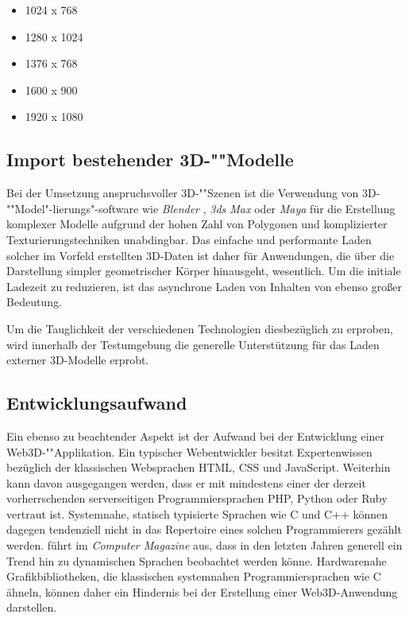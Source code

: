 \begin{itemize}[noitemsep]
	\item 1024 x 768
    \item 1280 x 1024
	\item 1376 x 768
	\item 1600 x 900
	\item 1920 x 1080
\end{itemize}

\subsection{Import bestehender 3D-""Modelle}

Bei der Umsetzung anspruchsvoller 3D-""Szenen ist die Verwendung von 3D-""Model"-lierungs"-software wie \emph{Blender} \autocite{SOFTWARE_BLENDER}, \emph{3ds Max} \autocite{SOFTWARE_3DS_MAX} oder \emph{Maya} \autocite{SOFTWARE_MAYA} für die Erstellung komplexer Modelle aufgrund der hohen Zahl von Polygonen und komplizierter Texturierungstechniken unabdingbar.
Das einfache und performante Laden solcher im Vorfeld erstellten 3D-Daten ist daher für Anwendungen, die über die Darstellung simpler geometrischer Körper hinausgeht, wesentlich. Um die initiale Ladezeit zu reduzieren, ist das asynchrone Laden von Inhalten von ebenso großer Bedeutung.

Um die Tauglichkeit der verschiedenen Technologien diesbezüglich zu erproben, wird innerhalb der Testumgebung die generelle Unterstützung für das Laden externer 3D-Modelle erprobt.

\subsection{Entwicklungsaufwand}
\label{SEC:DEVELOPMENT_EFFORT}
Ein ebenso zu beachtender Aspekt ist der Aufwand bei der Entwicklung einer Web3D-""Applikation. Ein typischer Webentwickler besitzt Expertenwissen bezüglich der klassischen Websprachen HTML, CSS und JavaScript. Weiterhin kann davon ausgegangen werden, dass er mit mindestens einer der derzeit vorherrschenden serverseitigen Programmiersprachen PHP, Python oder Ruby vertraut ist.
Systemnahe, statisch typisierte Sprachen wie C und C++ können dagegen tendenziell nicht in das Repertoire eines solchen Programmierers gezählt werden. \textcite{Paulson:2007} führt im \emph{Computer Magazine} aus, dass in den letzten Jahren generell ein Trend hin zu dynamischen Sprachen beobachtet werden könne. Hardwarenahe Grafikbibliotheken, die klassischen systemnahen Programmiersprachen wie C ähneln, können daher ein Hindernis bei der Erstellung einer Web3D-Anwendung darstellen.

